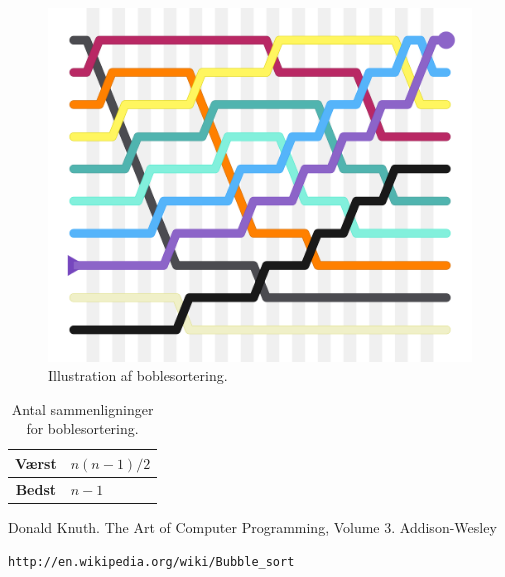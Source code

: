 \documentclass[a4paper]{article}
\begin{document}
\begin{figure}
	\centering
	\includegraphics[width=0.4\linewidth]{Bubblesort.png}
	\caption{Illustration af boblesortering.}
\end{figure}

\begin{table}[h!]
	\begin{center}
		
		\label{tab:table1}
		\begin{tabular}{|c|l|} %
			\hline
			\textbf{Værst} & \(n(n - 1)/2\)\\
			\hline
			\textbf{Bedst} & \(n-1\) \\
			\hline
		\end{tabular}
	
	\end{center}
	\caption{Antal sammenligninger for boblesortering.}
\end{table}



\begin{thebibliography}{99}

  Donald Knuth.
  The Art of Computer Programming,
  Volume 3.
  Addison-Wesley

\begin{verbatim}
http://en.wikipedia.org/wiki/Bubble_sort
\end{verbatim}

\end{thebibliography}
\end{document}
